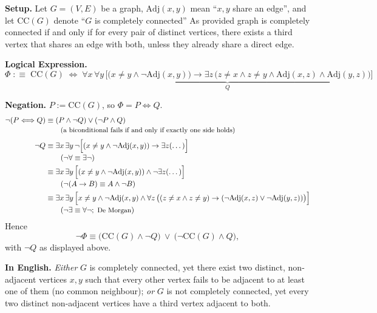 \documentclass[11pt,a4paper]{article}
\renewcommand{\iff}{\Longleftrightarrow}
\theoremstyle{definition}
\begin{document}
\subsubsection{}
\textbf{Setup.} Let $G=(V,E)$ be a graph, $\mathrm{Adj}(x,y)$ mean ``$x,y$ share an edge'', and let $\mathrm{CC}(G)$ denote ``$G$ is completely connected'' 
As provided graph is completely connected if and only if for every pair of distinct vertices, there exists a third
vertex that shares an edge with both, unless they already share a direct edge.

\textbf{Logical Expression.}
\[
\Phi\;:\equiv\;\mathrm{CC}(G)\;\Longleftrightarrow\;\underbrace{\forall x\,\forall y\,\Big[\big(x\neq y\wedge\neg\mathrm{Adj}(x,y)\big)\longrightarrow\exists z\,\big(z\neq x\wedge z\neq y\wedge\mathrm{Adj}(x,z)\wedge\mathrm{Adj}(y,z)\big)\Big]}_{Q}
\]

\textbf{Negation.} $P:=\mathrm{CC}(G)$, so $\Phi=P\iff Q$.
\begin{align*}
\neg(P\iff Q)&\equiv(P\wedge\neg Q)\vee(\neg P\wedge Q)\\[-2pt]
&\qquad\small \text{(a biconditional fails if and only if exactly one side holds)}\\[2pt]
\neg Q&\equiv\exists x\,\exists y\,\neg\Big[(x\neq y\wedge\neg\mathrm{Adj}(x,y))\to\exists z(\dots)\Big]\\[-2pt]
&\qquad\small (\neg\forall\equiv\exists\neg)\\
&\equiv\exists x\,\exists y\,\Big[(x\neq y\wedge\neg\mathrm{Adj}(x,y))\wedge\neg\exists z(\dots)\Big]\\[-2pt]
&\qquad\small (\neg(A\to B)\equiv A\wedge\neg B)\\
&\equiv\exists x\,\exists y\,\Big[x\neq y\wedge\neg\mathrm{Adj}(x,y)\wedge\forall z\,\big((z\neq x\wedge z\neq y)\to(\neg\mathrm{Adj}(x,z)\vee\neg\mathrm{Adj}(y,z))\big)\Big]\\[-2pt]
&\qquad\small (\neg\exists\equiv\forall\neg;\ \text{De Morgan})
\end{align*}
Hence
\[
\neg\Phi\equiv\Big(\mathrm{CC}(G)\wedge\neg Q\Big)\ \vee\ \Big(\neg\mathrm{CC}(G)\wedge Q\Big),
\]
with $\neg Q$ as displayed above.

\textbf{In English.} \emph{Either} $G$ is completely connected, yet there exist two distinct, non-adjacent vertices $x,y$ such that every other vertex fails to be adjacent to at least one of them (no common neighbour);
\emph{or} $G$ is not completely connected, yet every two distinct non-adjacent vertices have a third vertex adjacent to both.
\end{document}
